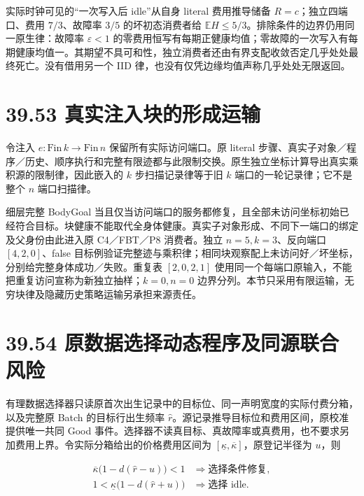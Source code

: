 \documentclass[
  11pt,
  oneside]{book}
\begin{document}
实际时钟可见的``一次写入后 idle''从自身 literal 费用推导储备 \(R=c\)；独立四端口、费用 \(7/3\)、故障率 \(3/5\) 的坏初态消费者给 \(\mathbb E H\le5/3\)。排除条件的边界仍用同一原生律：故障率 \(\varepsilon<1\) 的零费用恒写有每期正健康均值；零故障的一次写入有每期健康均值一。其期望不具可和性，独立消费者还由有界支配收敛否定几乎处处最终死亡。没有借用另一个 IID 律，也没有仅凭边缘均值声称几乎处处无限返回。

\section{39.53 真实注入块的形成运输}\label{ux771fux5b9eux6ce8ux5165ux5757ux7684ux5f62ux6210ux8fd0ux8f93}

令注入 \(e:\mathrm{Fin}\,k\to\mathrm{Fin}\,n\) 保留所有实际访问端口。原 literal 步骤、真实子对象／程序／历史、顺序执行和完整有限迹都与此限制交换。原生独立坐标计算导出真实乘积源的限制律，因此嵌入的 \(k\) 步扫描记录律等于旧 \(k\) 端口的一轮记录律；它不是整个 \(n\) 端口扫描律。

细层完整 BodyGoal 当且仅当访问端口的服务都修复，且全部未访问坐标初始已经符合目标。块健康不能取代全身体健康。真实子对象形成、不同下一端口的绑定及父身份由此进入原 C4／FBT／P8 消费者。独立 \(n=5,k=3\)、反向端口 \([4,2,0]\)、false 目标例验证完整迹与乘积律；相同块观察配上未访问好／坏坐标，分别给完整身体成功／失败。重复表 \([2,0,2,1]\) 使用同一个每端口原输入，不能把重复访问宣称为新独立抽样；\(k=0,n=0\) 边界分列。本节只采用有限运输，无穷块律及隐藏历史策略运输另承担来源责任。

\section{39.54 原数据选择动态程序及同源联合风险}\label{ux539fux6570ux636eux9009ux62e9ux52a8ux6001ux7a0bux5e8fux53caux540cux6e90ux8054ux5408ux98ceux9669}

有理数据选择器只读原首次出生记录中的目标位、同一声明宽度的实际付费分箱，以及完整原 Batch 的目标行出生频率 \(\widehat r\)。源记录推导目标位和费用区间，原校准提供唯一共同 Good 事件。选择器不读真目标、真故障率或真费用，也不要求另加费用上界。令实际分箱给出的价格费用区间为 \([\underline\kappa,\overline\kappa]\)，原登记半径为 \(u\)，则

\[\begin{aligned}
\overline\kappa\bigl(1-d(\widehat r-u)\bigr)<1
&\Longrightarrow\text{选择条件修复},\\
1<\underline\kappa\bigl(1-d(\widehat r+u)\bigr)
&\Longrightarrow\text{选择 idle}.
\end{aligned}\]
\end{document}
